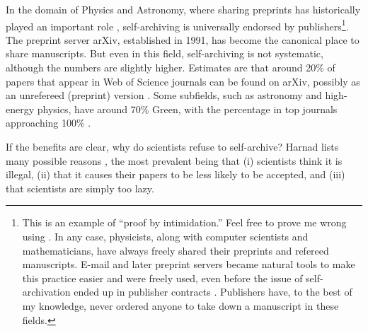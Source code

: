\documentclass[11pt, openany, oneside, article, a4paper, twocolumn]{memoir}
\begin{document}
In the domain of Physics and Astronomy, where sharing preprints has
historically played an important role \cite{brown2001evolution},
self-archiving is universally endorsed by publishers\footnote{This is an
example of \enquote{proof by intimidation.} Feel free to prove me wrong
using \cite{sherpa_romeo}. In any case, physicists, along with computer
scientists and mathematicians, have always freely shared their preprints
and refereed manuscripts. E-mail and later preprint servers became natural
tools to make this practice easier and were freely used, even before the
issue of self-archivation ended up in publisher contracts
\cite{brown2001evolution}. Publishers have, to the best of my knowledge,
never ordered anyone to take down a manuscript in these fields.}. The
preprint server arXiv, established in 1991, has become the canonical place
to share manuscripts. But even in this field, self-archiving is not
systematic, although the numbers are slightly higher. Estimates are that
around 20\% of papers that appear in Web of Science journals can be found
on arXiv, possibly as an unrefereed (preprint) version
\cite{bjork2010open, lariviere2014arxiv}. Some subfields, such as
astronomy and high-energy physics, have around 70\% Green, with the
percentage in top journals approaching 100\% \cite{gentil2010citinghep}.

If the benefits are clear, why do scientists refuse to self-archive?
Harnad lists many possible reasons \cite{harnad2006opening}, the most
prevalent being that (i) scientists think it is illegal, (ii) that it
causes their papers to be less likely to be accepted, and (iii) that
scientists are simply too lazy.
\end{document}
